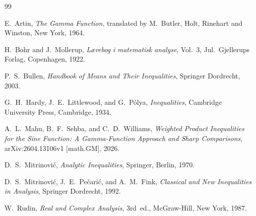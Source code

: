 \documentclass[12pt]{amsart}
\theoremstyle{definition}
\begin{document}
\begin{thebibliography}{99}

E.~Artin,
\textit{The Gamma Function},
translated by M.~Butler,
Holt, Rinehart and Winston, New York, 1964.

H.~Bohr and J.~Mollerup,
\textit{L{\ae}rebog i matematisk analyse}, Vol.~3,
Jul.~Gjellerups Forlag, Copenhagen, 1922.

P.~S.~Bullen,
\textit{Handbook of Means and Their Inequalities},
Springer Dordrecht, 2003.

G.~H.~Hardy, J.~E.~Littlewood, and G.~P\'{o}lya,
\textit{Inequalities},
Cambridge University Press, Cambridge, 1934.

A.~L.~Mahu, B.~F.~Sehba, and C.~D.~Williams,
\textit{Weighted Product Inequalities for the Sine Function: A Gamma-Function Approach and Sharp Comparisons},
arXiv:2604.13106v1 [math.GM], 2026.

D.~S.~Mitrinovi\'c,
\textit{Analytic Inequalities},
Springer, Berlin, 1970.

D.~S.~Mitrinovi\'c, J.~E.~Pe\v{c}ari\'c, and A.~M.~Fink,
\textit{Classical and New Inequalities in Analysis},
Springer Dordrecht, 1992.

W.~Rudin,
\textit{Real and Complex Analysis}, 3rd~ed.,
McGraw-Hill, New York, 1987.

\end{thebibliography}
\end{document}
